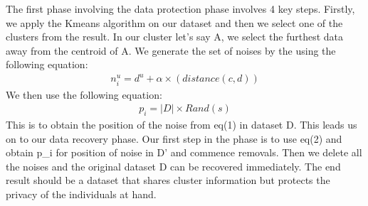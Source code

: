 \documentclass[letterpaper,10pt,english]{jupyterBook}
\begin{document}
\sphinxAtStartPar
The first phase involving the data protection phase involves 4 key steps. Firstly, we apply the K\sphinxhyphen{}means algorithm on our dataset and then we select one of the clusters from the result. In our cluster let’s say A, we select the furthest data away from the centroid of A. We generate the set of noises by the using the following equation:
\begin{equation*}
\begin{split}
 n_i^u = d^{u} + \alpha \times (distance(c,d)) \tag{1}
\end{split}
\end{equation*}
\sphinxAtStartPar
We then use the following equation:
\begin{equation*}
\begin{split}
 p_i = |D| \times Rand(s) \tag{2}
\end{split}
\end{equation*}
\sphinxAtStartPar
This is to obtain the position of the noise from eq(1) in dataset D. This leads us on to our data recovery phase. Our first step in the phase is to use eq(2) and obtain p\_i for position of noise in D’ and commence removals. Then we delete all the noises and the original dataset D can be recovered immediately. The end result should be a dataset that shares cluster information but protects the privacy of the individuals at hand.

\begin{sphinxVerbatim}[commandchars=\\\{\}]
  \PYG{p}{[}\PYG{p}{[} \PYG{p}{]}\PYG{p}{]}
  
\end{sphinxVerbatim}
\end{document}
